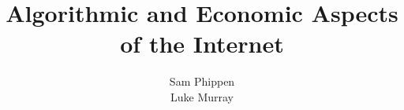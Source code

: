 \documentclass{acm_proc_article-sp}
\begin{document}
\title{Algorithmic and Economic Aspects of the Internet}
%
%
%
%
%

%
\author{
%
%
\alignauthor
Sam Phippen\\
\alignauthor
Luke Murray
}
\end{document}
